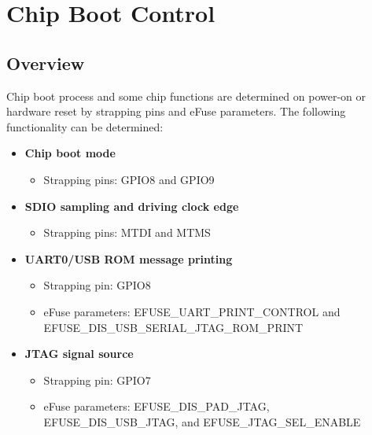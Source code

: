 \documentclass[main\_\_EN.tex]{subfiles}
\begin{document}

\ifglobal
\else
    \listoftodos
    {\let\clearpage\relax \listofdonetodos}
    \tableofcontents
\fi



\hypertarget{bootctrl}{}
\chapter{Chip Boot Control}
\label{mod:bootctrl}


\section{Overview}

Chip boot process and some chip functions are determined on power-on or hardware reset by strapping pins and eFuse parameters. The following functionality can be determined:

\begin{itemize}
    \item \textbf{Chip boot mode}
        \begin{itemize}
            \item Strapping pins: GPIO8 and GPIO9
        \end{itemize}
    \item \textbf{SDIO sampling and driving clock edge}
        \begin{itemize}
            \item Strapping pins: MTDI and MTMS
        \end{itemize}%
    \item \textbf{UART0/USB ROM message printing}
        \begin{itemize}
            \item Strapping pin: GPIO8
            \item eFuse parameters: EFUSE\_UART\_PRINT\_CONTROL and EFUSE\_DIS\_USB\_SERIAL\_JTAG\_ROM\_PRINT
        \end{itemize}
    \item \textbf{JTAG signal source}
        \begin{itemize}
            \item Strapping pin: GPIO7
            \item eFuse parameters: EFUSE\_DIS\_PAD\_JTAG, EFUSE\_DIS\_USB\_JTAG, and EFUSE\_JTAG\_SEL\_ENABLE
        \end{itemize}
\end{itemize}
\end{document}
